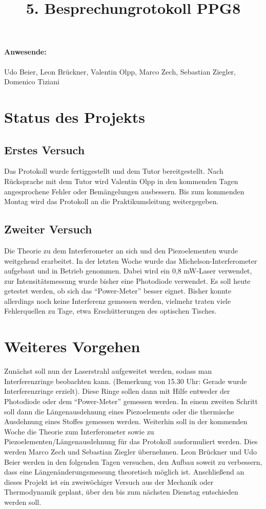 \documentclass[
]{scrartcl}
\begin{document}
\title{5. Besprechungrotokoll PPG8}
\maketitle

\paragraph{Anwesende:}
Udo Beier, Leon Brückner, Valentin Olpp, Marco Zech, Sebastian Ziegler, Domenico Tiziani


\section{Status des Projekts}

\subsection{Erstes Versuch}
Das Protokoll wurde fertiggestellt und dem Tutor bereitgestellt. Nach Rücksprache mit dem Tutor wird Valentin Olpp in den kommenden Tagen angesprochene Fehler oder Bemängelungen ausbessern. Bis zum kommenden Montag wird das Protokoll an die Praktikumsleitung weitergegeben. 

\subsection{Zweiter Versuch}
Die Theorie zu dem Interferometer an sich und den Piezoelementen wurde weitgehend erarbeitet. In der letzten Woche wurde das Michelson-Interferometer aufgebaut und in Betrieb genommen. Dabei wird ein 0,8 mW-Laser verwendet, zur Intensitätsmessung wurde bisher eine Photodiode verwendet. Es soll heute getestet werden, ob sich das \enquote{Power-Meter} besser eignet. Bisher konnte allerdings noch keine Interferenz gemessen werden, vielmehr traten viele Fehlerquellen zu Tage, etwa Erschütterungen des optischen Tisches. 

\section{Weiteres Vorgehen}
Zunächst soll nun der Laserstrahl aufgeweitet werden, sodass man Interferenzringe beobachten kann. (Bemerkung von 15.30 Uhr: Gerade wurde Interferenzringe erzielt). Diese Ringe sollen dann mit Hilfe entweder der Photodiode oder dem \enquote{Power-Meter} gemessen werden. In einem zweiten Schritt soll dann die Längenausdehnung eines Piezoelements oder die thermische Ausdehnung eines Stoffes gemessen werden. Weiterhin soll in der kommenden Woche die Theorie zum Interferometer sowie zu Piezoelementen/Längenausdehnung für das Protokoll ausformuliert werden. Dies werden Marco Zech und Sebastian Ziegler übernehmen. Leon Brückner und Udo Beier werden in den folgenden Tagen versuchen, den Aufbau soweit zu verbessern, dass eine Längenänderungsmessung theoretisch möglich ist. 
Anschließend an dieses Projekt ist ein zweiwöchiger Versuch aus der Mechanik oder Thermodynamik geplant, über den bis zum nächsten Dienstag entschieden werden soll. 
\end{document}
